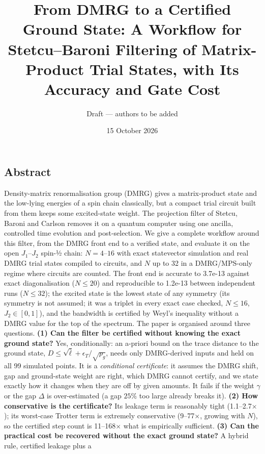 \documentclass[
]{article}
\title{From DMRG to a Certified Ground State: A Workflow for
Stetcu--Baroni Filtering of Matrix-Product Trial States, with Its
Accuracy and Gate Cost}
\author{Draft --- authors to be added}
\date{15 October 2026}
\begin{document}
\maketitle

\hypertarget{abstract}{%
\subsection{Abstract}\label{abstract}}

Density-matrix renormalisation group (DMRG) gives a matrix-product state
and the low-lying energies of a spin chain classically, but a compact
trial circuit built from them keeps some excited-state weight. The
projection filter of Stetcu, Baroni and Carlson removes it on a quantum
computer using one ancilla, controlled time evolution and
post-selection. We give a complete workflow around this filter, from the
DMRG front end to a verified state, and evaluate it on the open
\(J_1\)--\(J_2\) spin-½ chain: \(N=4\)--\(16\) with exact statevector
simulation and real DMRG trial states compiled to circuits, and \(N\) up
to 32 in a DMRG/MPS-only regime where circuits are counted. The front
end is accurate to 3.7e-13 against exact diagonalisation (\(N\le20\))
and reproducible to 1.2e-13 between independent runs (\(N\le32\)); the
excited state is the lowest state of any symmetry (its symmetry is not
assumed; it was a triplet in every exact case checked, \(N\le16\),
\(J_2\in[0,1]\)), and the bandwidth is certified by Weyl's inequality
without a DMRG value for the top of the spectrum. The paper is organised
around three questions. \textbf{(1) Can the filter be certified without
knowing the exact ground state?} Yes, conditionally: an a-priori bound
on the trace distance to the ground state,
\(D\le\sqrt{\bar\ell}+\epsilon_T/\sqrt{p_g}\), needs only DMRG-derived
inputs and held on all 99 simulated points. It is a \emph{conditional
certificate}: it assumes the DMRG shift, gap and ground-state weight are
right, which DMRG cannot certify, and we state exactly how it changes
when they are off by given amounts. It fails if the weight \(\gamma\) or
the gap \(\Delta\) is over-estimated (a gap \(25\%\) too large already
breaks it). \textbf{(2) How conservative is the certificate?} Its
leakage term is reasonably tight (1.1--2.7\(\times\)); its worst-case
Trotter term is extremely conservative (9--77\(\times\), growing with
\(N\)), so the certified step count is 11--168\(\times\) what is
empirically sufficient. \textbf{(3) Can the practical cost be recovered
without the exact ground state?} A hybrid rule, certified leakage plus a
\end{document}
